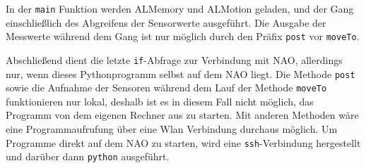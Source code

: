 In der \texttt{main} Funktion werden ALMemory und ALMotion geladen, und der Gang einschließlich des Abgreifens der Sensorwerte ausgeführt. Die Ausgabe der Messwerte während dem Gang ist nur möglich durch den Präfix \texttt{post} vor \texttt{moveTo}.

Abschließend dient die letzte \texttt{if}-Abfrage zur Verbindung mit NAO, allerdings nur, wenn dieses Pythonprogramm selbst auf dem NAO liegt. Die Methode \texttt{post} sowie die Aufnahme der Sensoren während dem Lauf der Methode \texttt{moveTo} funktionieren nur lokal, deshalb ist es in diesem Fall nicht möglich, das Programm von dem eigenen Rechner aus zu starten. Mit anderen Methoden wäre eine Programmaufrufung über eine Wlan Verbindung durchaus möglich. Um Programme direkt auf dem NAO zu starten, wird eine \texttt{ssh}-Verbindung hergestellt und darüber dann \texttt{python} ausgeführt.
		
